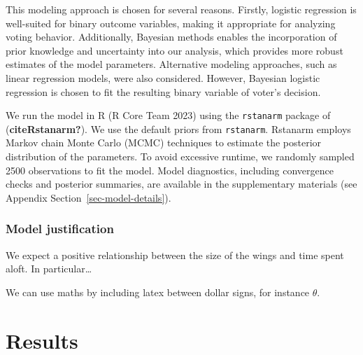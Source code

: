 \documentclass[
  letterpaper,
  DIV=11,
  numbers=noendperiod]{scrartcl}
\begin{document}
This modeling approach is chosen for several reasons. Firstly, logistic
regression is well-suited for binary outcome variables, making it
appropriate for analyzing voting behavior. Additionally, Bayesian
methods enables the incorporation of prior knowledge and uncertainty
into our analysis, which provides more robust estimates of the model
parameters. Alternative modeling approaches, such as linear regression
models, were also considered. However, Bayesian logistic regression is
chosen to fit the resulting binary variable of voter's decision.

We run the model in R (R Core Team 2023) using the \texttt{rstanarm}
package of (\textbf{citeRstanarm?}). We use the default priors from
\texttt{rstanarm}. Rstanarm employs Markov chain Monte Carlo (MCMC)
techniques to estimate the posterior distribution of the parameters. To
avoid excessive runtime, we randomly sampled 2500 observations to fit
the model. Model diagnostics, including convergence checks and posterior
summaries, are available in the supplementary materials (see Appendix
Section~\ref{sec-model-details}).

\hypertarget{model-justification}{%
\subsubsection{Model justification}\label{model-justification}}

We expect a positive relationship between the size of the wings and time
spent aloft. In particular\ldots{}

We can use maths by including latex between dollar signs, for instance
\(\theta\).

\hypertarget{results}{%
\section{Results}\label{results}}
\end{document}
